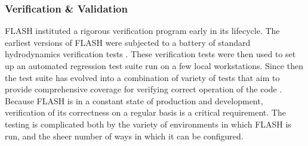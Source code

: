 \subsubsection{Verification \& Validation}
\label{sec:FLASHvandv}

FLASH instituted a rigorous verification program early in its
lifecycle. The earliest versions of FLASH were subjected to
a battery of standard hydrodynamics verification tests
\cite{Fryxell2000}. These verification tests were then used to set up
an automated regression test suite run on a few local
workstations. Since then the test suite has evolved into a
combination of variety of tests that aim to provide comprehensive
coverage for verifying correct operation of the code
\cite{Dubey2013,Calder2005}. Because FLASH is in a constant state of
production and development, verification of its correctness on a
regular basis is a critical requirement.  The testing is complicated
both by the variety of environments in which FLASH is run, and the
sheer number of ways in which it can be configured. 


